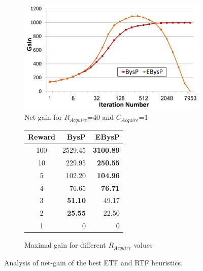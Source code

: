 \documentclass[prodmode,acmtecs]{acmsmall} %
\begin{document}
\begin{figure}

\centering
\begin{subfigure}{.55\textwidth}
  \centering
\includegraphics[width=\linewidth]{Cost_Iteration.pdf}%

\caption{Net gain for $R_{Acquire}$=40 and $C_{Acquire}$=1}%
\label{fig:CostIteration}
\end{subfigure}%
\quad
\begin{subfigure}{.3\textwidth}
  \centering
\begin{tabular}{c|r|r}
Reward & BysP & EBysP \\\hline
100 & 2529.45 & {\bf 3100.89} \\
10 & 229.95 & {\bf 250.55} \\
5 & 102.20 & {\bf 104.96} \\
4 & 76.65 & {\bf 76.71} \\
3 & \textbf{51.10} & 49.17 \\
2 & \textbf{25.55} & 22.50 \\
1 & 0 & 0 \\
\end{tabular}%
\caption{Maximal gain for different $R_{Acquire}$ values}%
\label{tab:Reward}%
\end{subfigure}

\caption{Analysis of net-gain of the best ETF and RTF heuristics.}
\label{fig:net-gain}
\end{figure}
\end{document}
